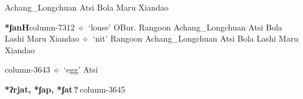          Achang\_Longchuan 
\hspace{1ex}
         Atsi 
\hspace{1ex}
         Bola 
\hspace{1ex}
         Maru 
\hspace{1ex}
         Xiandao 
  \item {\footnotesize \textbf{*ʃanH}}{\tiny column-7312}
         $\diamond$~`louse'
         OBur. 
\hspace{1ex}
         Rangoon 
\hspace{1ex}
         Achang\_Longchuan 
\hspace{1ex}
         Atsi 
\hspace{1ex}
         Bola 
\hspace{1ex}
         Lashi 
\hspace{1ex}
         Maru 
\hspace{1ex}
         Xiandao 
\hspace{1ex}
         $\diamond$~`nit'
         Rangoon 
\hspace{1ex}
         Achang\_Longchuan 
\hspace{1ex}
         Atsi 
\hspace{1ex}
         Bola 
\hspace{1ex}
         Lashi 
\hspace{1ex}
         Maru 
\hspace{1ex}
         Xiandao 
  \item {\footnotesize \textbf{}}{\tiny column-3643}
         $\diamond$~`egg'
         Atsi 
  \item {\footnotesize \textbf{*ʔrjat, *ʃap, *ʃat\,?\,}}{\tiny column-3645}
